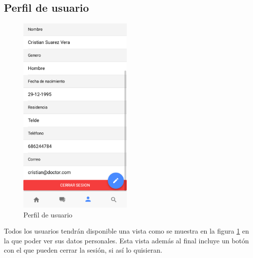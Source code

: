 \subsection{Perfil de usuario}
\begin{figure}[!h]
    \centering
    \includegraphics[width=0.5\textwidth]{images/screenshots/Perfil.png}
    \caption{Perfil de usuario}
    \label{perfil-usuario}
\end{figure}

Todos los usuarios tendrán disponible una vista como se muestra en la figura
\ref{perfil-usuario} en la que poder ver sus datos personales. Esta vista
además al final incluye un botón con el que pueden cerrar la sesión, si así
lo quisieran.
\clearpage

